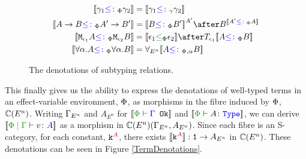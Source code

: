 \begin{figure}[H]
    \centering
    \begin{framed}
        \begin{align*}
            \deno{\g_1\subtypep \g_2} &= \deno{\g_1\subtypeg \g_2}
            \\
            \deno{\ab \subtypep \fntype{A'}{B'}} &= \deno{B\subtypep B'}^{A'}\after B^{\deno{A'\subtypep A}}
            \\
            \deno{\M{\e_1}{A}\subtypep\M{\e_2}{B}} &= \deno{\e_1\subeffectp\e_2}\after\T{\e_1}{\deno{A\subtypep B}}
            \\
            \deno{\all{\a}{A}\subtypep\all{\a}{B}} &= \allEn{\deno{A\subtypepa B}}
        \end{align*}
    \end{framed}
    
    \caption{The denotations of subtyping relations.}
    \label{SubtypingDenotations}
\end{figure}


This finally gives us the ability to express the denotations of well-typed terms in an effect-variable environment, $\P$, as morphisms in the fibre induced by $\P$, $\C(E^n)$.  Writing $\G_{E^n}$ and $A_{E^n}$ for $\deno{\wellformedok{\P}{\G}}$ and $\deno{\typerelation{\P}{A}{\type}}$, we can derive $\deno{\gpetyperelation{v}{A}}$ as a morphism in $\C(E^n)(\G_{E^n}, A_{E^n})$. Since each fibre is an S-category, for each constant, $\const{A}$, there exists $\deno{\const{A}}: \1 \rightarrow A_{E^n}$ in $\C(E^n)$. These denotations can be seen in Figure \ref{TermDenotations}.

